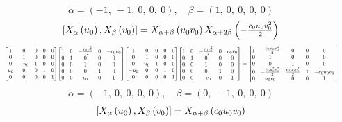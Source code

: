 \documentclass[11pt]{article}
\theoremstyle{definition}
\begin{document}
\[
\alpha = \left( -1, \  -1, \  0, \  0, \  0\right), \quad \beta = \left( 1, \  0, \  0, \  0, \  0\right)
\]
\[
\scaletoalign{\textwidth}{\left[ X_{\alpha}\left(u_{0}\right), X_{\beta}\left(v_{0}\right) \right] = X_{\alpha + \beta}\left(u_{0} v_{0}\right) X_{\alpha + 2\beta}\left(- \frac{c_{0} u_{0} v_{0}^{2}}{2}\right)}
\]
\[
\scaletoalign{\textwidth}{{\left[\begin{matrix}1 & 0 & 0 & 0 & 0\\0 & 1 & 0 & 0 & 0\\0 & - u_{0} & 1 & 0 & 0\\u_{0} & 0 & 0 & 1 & 0\\0 & 0 & 0 & 0 & 1\end{matrix}\right]} {\left[\begin{matrix}1 & 0 & - \frac{c_{0} v_{0}^{2}}{2} & 0 & - c_{0} v_{0}\\0 & 1 & 0 & 0 & 0\\0 & 0 & 1 & 0 & 0\\0 & 0 & 0 & 1 & 0\\0 & 0 & v_{0} & 0 & 1\end{matrix}\right]} {\left[\begin{matrix}1 & 0 & 0 & 0 & 0\\0 & 1 & 0 & 0 & 0\\0 & u_{0} & 1 & 0 & 0\\- u_{0} & 0 & 0 & 1 & 0\\0 & 0 & 0 & 0 & 1\end{matrix}\right]} {\left[\begin{matrix}1 & 0 & - \frac{c_{0} v_{0}^{2}}{2} & 0 & c_{0} v_{0}\\0 & 1 & 0 & 0 & 0\\0 & 0 & 1 & 0 & 0\\0 & 0 & 0 & 1 & 0\\0 & 0 & - v_{0} & 0 & 1\end{matrix}\right]} = {\left[\begin{matrix}1 & - \frac{c_{0} u_{0} v_{0}^{2}}{2} & 0 & 0 & 0\\0 & 1 & 0 & 0 & 0\\0 & 0 & 1 & 0 & 0\\0 & - \frac{c_{0} u_{0}^{2} v_{0}^{2}}{2} & \frac{c_{0} u_{0} v_{0}^{2}}{2} & 1 & - c_{0} u_{0} v_{0}\\0 & u_{0} v_{0} & 0 & 0 & 1\end{matrix}\right]}}
\]
\[
\alpha = \left( -1, \  0, \  0, \  0, \  0\right), \quad \beta = \left( 0, \  -1, \  0, \  0, \  0\right)
\]
\[
\scaletoalign{\textwidth}{\left[ X_{\alpha}\left(u_{0}\right), X_{\beta}\left(v_{0}\right) \right] = X_{\alpha + \beta}\left(c_{0} u_{0} v_{0}\right)}
\]
\end{document}
